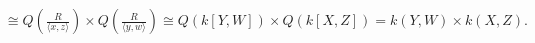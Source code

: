 \begin{example*}
\begin{enumerate}
\begin{align*}
                &\cong Q\left(\frac{R}{\langle x,z \rangle}\right) \times Q\left(\frac{R}{\langle y,w \rangle}\right) \cong Q(k[Y,W]) \times Q(k[X,Z]) = k(Y,W) \times k(X,Z).
            \end{align*}
            \begin{comment}
            \par Let $R_1: = \frac{R}{\langle \overbar{X}, \overbar{Z} \rangle} \cong k[Y,W]$ and $R_2 := \frac{R}{\langle \overbar{Y}, \overbar{W} \rangle} \cong k[X,Z]$. Note $R_1$ is an integral domain and $U^{-1}R_1$ is a field. By UMP, there exists a unique ring homomorphism $\overbar{\varphi}_1$ such that the following diagram commutes. Also, since $\overbar{\varphi}_1 \neq 0$ and $\operatorname{Q}(R_1)$ is a field, $\overbar{\varphi}_1$ is 1-1. Let $\frac{r}{u} \in U^{-1}R_1$ with $r \in R$ and $u \in \pi_1(U) = \pi_1(R \setminus (\langle \overbar{X},\overbar{Z} \rangle \cup \langle \overbar{Y}, \overbar{W} \rangle)) \subseteq R_1 \setminus \{0\}$. Then $\frac{r}{u} \in \operatorname{Q}(R_1)$. Since $\overbar{\varphi}_1(\frac{r}{u}) = \frac{\varphi_1(r)}{\varphi_1(u)} = \frac{r/1}{u/1} = \frac{r}{u}$, we have $\overbar{\varphi_1}$ is onto. Hence $\operatorname{Q}(R_1) \cong U^{-1}R_1$. Similarly, $\operatorname{Q}(R_2) \cong U^{-1}R_2$.
             \begin{center}
                \begin{tikzpicture}[node distance = 1.5cm, auto]
                    \node (R) {$R_1$};
                    \node (QR)[right of=R] {$\operatorname{Q}(R_1)$};
                    \node (L)[below of=QR] {$U^{-1}R_1$};
                    \node (r)[node distance=0.7cm, left of=R, above of=R] {$r_1$};
                    \node (qr)[node distance=0.7cm, right of=QR, above of=QR] {$\frac{r_1}{1}$};
                    \node (qru)[node distance=1.6cm, right of=QR] {$\frac{r_1}{u_1}$};
                    \node (lu)[below of=qru] {$\frac{\varphi_1(r_1)}{\varphi_1(u_1)}$};
                    \node (l)[node distance=0.7cm, below of=L] {$r_1/1 = \frac{r_1/1}{1/1}$};
                    \draw[->] (R) to node {$\psi_1$} (QR);
                    \draw[right hook->] (R) to node [swap]{$\varphi_1$} (L);
                    \draw[->,dashed] (QR) to node {$\ex !\ \overbar \varphi_1$} (L);
                    \draw[|->] (r) to node {} (qr);
                    \draw[|->,bend right] (r) to node {} (l);
                    \draw[|->,bend left=45] (qr) to node {} (l);
                    \draw[|->] (qru) to node {} (lu);
                \end{tikzpicture}

\end{comment}
\end{enumerate}
\end{example*}
